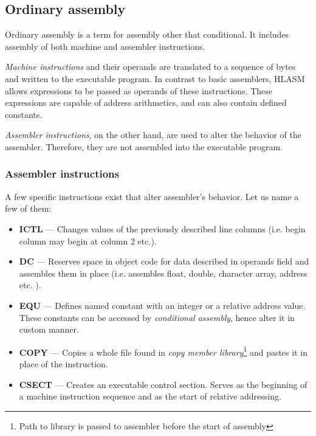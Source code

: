\subsection{Ordinary assembly}

Ordinary assembly is a term for assembly other that conditional. It includes assembly of both machine and assembler instructions. 

\emph{Machine instructions} and their operands are translated to a sequence of bytes and written to the executable program. In contrast to basic assemblers, HLASM allows expressions to be passed as operands of these instructions. These expressions are capable of address arithmetics, and can also contain defined constants.

\emph{Assembler instructions}, on the other hand, are used to alter the behavior of the assembler. Therefore, they are not assembled into the executable program.

\subsubsection{Assembler instructions}

A few specific instructions exist that alter assembler's behavior. Let us name a few of them:
\begin{itemize}
	\item \textbf{ICTL} --- Changes values of the previously described line columns (i.e. begin column may begin at column 2 etc.).
	
	\item \textbf{DC} --- Reserves space in object code for data described in operands field and assembles them in place (i.e. assembles float, double, character array, address etc. ).
	
	\item \textbf{EQU} --- Defines named constant with an integer or a relative address value. These constants can be accessed by \emph{conditional assembly}, hence alter it in custom manner.
	
	\item \textbf{COPY} --- Copies a whole file found in \emph{copy member library}\footnote{Path to library is passed to assembler before the start of assembly} and pastes it in place of the instruction.
	
	\item \textbf{CSECT} --- Creates an executable control section. Serves as the beginning of a machine instruction sequence and as the start of relative addressing.
\end{itemize}

